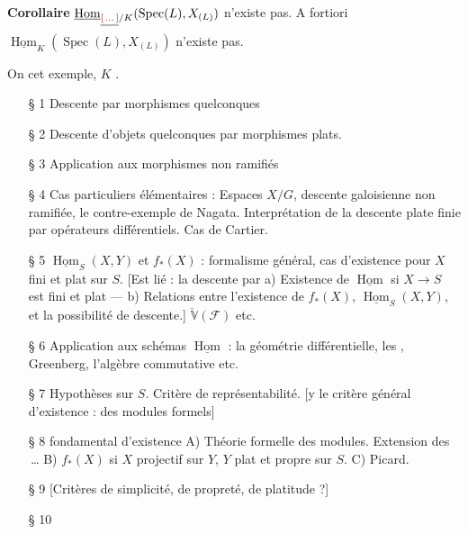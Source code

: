 \documentclass[11pt,a4paper]{article}
\begin{document}
\textbf{Corollaire} $\underline{\operatorname{Hom}}_{\struck{\ill{}}/K}(\operatorname{Spec}(L), X_{(L)})$
n'existe pas. A fortiori $\underline{\operatorname{Hom}}_K(\operatorname{Spec}(L), X_{(L)})$
n'existe pas.

On   \ill{}   \ill{} cet
exemple, $K$ \ill{}.


\begin{itemize}
\item[§ 1] Descente  par morphismes quelconques
\item[§ 2] Descente d'objets quelconques par morphismes plats.
 
\item[§ 3] Application  aux morphismes non ramifiés
\item[§ 4] Cas particuliers élémentaires : Espaces $X/G$,
descente galoisienne non ramifiée, le contre-exemple de Nagata.
Interprétation de la descente plate finie par opérateurs différentiels. Cas de Cartier.
\item[§ 5] $\underline{\operatorname{Hom}}_S(X,Y)$ et $f_*(X)$ : formalisme général, cas
d'existence pour $X$ fini et plat sur $S$.
[Est lié : la descente par \struck{\ill{}}  
a) Existence de $\underline{\operatorname{Hom}}$ si $X \to S$ est  
 
\ill{} fini et plat ---
b) Relations entre l'existence de $f_*(X)$, $\underline{\operatorname{Hom}}_S(X,Y)$,
et la possibilité de descente.]
 $\check{\mathbb{V}}(\mathcal{F})$ etc.
\item[§ 6] Application aux schémas $\underline{\operatorname{Hom}}$ : la géométrie
différentielle, les , Greenberg, l'algèbre commutative etc.
\item[§ 7] Hypo\struck{\ill{}}thèses sur $S$. Critère de représentabilité.
[y   le critère général d'existence :
\ill{} des modules formels]
\item[§ 8] \struck{(\ill{})}  fondamental d'existence
A) Théorie formelle des modules. Extension des \,…
B) $f_*(X)$ si $X$ projectif sur $Y$, $Y$ plat et propre sur $S$.
C) Picard.
\item[§ 9] [Critères de simplicité, de propreté, de platitude ?]
\item[§ 10] 
\end{itemize}
\end{document}
